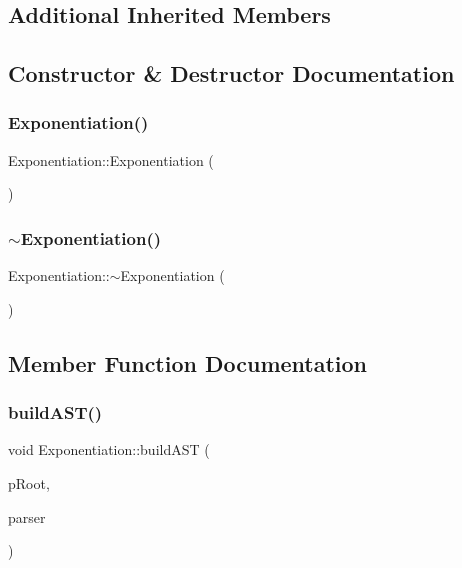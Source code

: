 \subsection*{Additional Inherited Members}


\subsection{Constructor \& Destructor Documentation}
\mbox{\label{class_exponentiation_ae79937f14e7e06551272222eee26be58}} 
\subsubsection{\texorpdfstring{Exponentiation()}{Exponentiation()}}
{\footnotesize\ttfamily Exponentiation\+::\+Exponentiation (\begin{DoxyParamCaption}{ }\end{DoxyParamCaption})}

\mbox{\label{class_exponentiation_a626e91a0ebf2723770a1b6d53ff5a9d2}} 
\subsubsection{\texorpdfstring{$\sim$Exponentiation()}{~Exponentiation()}}
{\footnotesize\ttfamily Exponentiation\+::$\sim$\+Exponentiation (\begin{DoxyParamCaption}{ }\end{DoxyParamCaption})}



\subsection{Member Function Documentation}
\mbox{\label{class_exponentiation_a7c600d4b547358c563edfc76ae8ac8a6}} 
\subsubsection{\texorpdfstring{buildAST()}{buildAST()}}
{\footnotesize\ttfamily void Exponentiation\+::build\+A\+ST (\begin{DoxyParamCaption}\item[{std\+::unique\+\_\+ptr$<$ \mbox{\hyperlink{class_abstract_expression}{Abstract\+Expression}} $>$ \&}]{p\+Root,  }\item[{\mbox{\hyperlink{class_parser}{Parser}} \&}]{parser }\end{DoxyParamCaption})\hspace{0.3cm}{\ttfamily [virtual]}}



